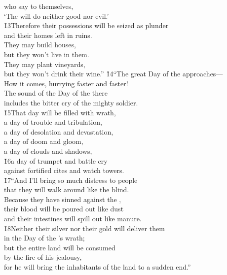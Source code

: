 \begin{poetry}
\poeml who say to themselves, \\
\poemll    `The  will do neither good nor evil.' \\
\poeml \v{13}Therefore their possessions will be seized as plunder \\
\poemll    and their homes left in ruins. \\
\poeml They may build houses, \\
\poemll    but they won't live in them. \\
\poeml They may plant vineyards, \\
\poemll    but they won't drink their wine.''
\poeml \v{14}``The great Day of the  approaches--- \\
\poemll    How it comes, hurrying faster and faster! \\
\poeml The sound of the Day of the  there \\
\poemll    includes the bitter cry of the mighty soldier. \\
\poeml \v{15}That day will be filled with wrath, \\
\poemll    a day of trouble and tribulation, \\
\poeml a day of desolation and devastation, \\
\poemll    a day of doom and gloom, \\
\poeml a day of clouds and shadows, \\
\poeml \v{16}a day of trumpet and battle cry \\
\poemlll       against fortified cites and watch towers. \\
\poeml \v{17}``And I'll bring so much distress to people \\
\poemll    that they will walk around like the blind. \\
\poeml Because they have sinned against the , \\
\poemll    their blood will be poured out like dust \\
\poemlll       and their intestines will spill out like manure. \\
\poeml \v{18}Neither their silver nor their gold will deliver them \\
\poemll    in the Day of the 's wrath; \\
\poeml but the entire land will be consumed \\
\poemll    by the fire of his jealousy, \\
\poeml for he will bring the inhabitants of the land to a sudden end.''
\end{poetry}

